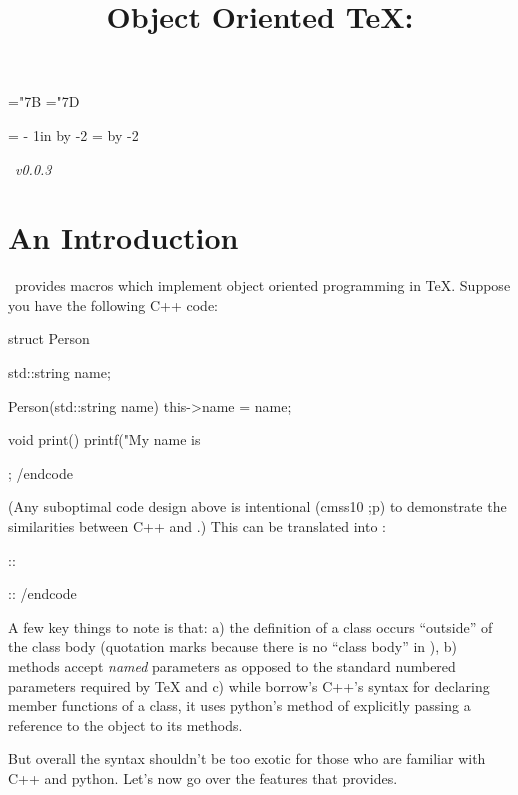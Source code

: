 \chardef\lbrace="7B
\chardef\rbrace="7D

\def\parameter#1{$\langle$#1$\rangle$}
\def\cparameter#1{$\{\langle$#1$\rangle\}$}
\def\bparameter#1{$[\langle$#1$\rangle]$}

\parindent=0pt
\parskip=3pt
\hoffset=\dimexpr 1.5cm - 1in \relax
\advance\hsize by -2\hoffset
\voffset=\hoffset
\advance\vsize by -2\voffset

\title{Object Oriented \TeX: \OoP\par}
\hfill \OoP\ {\it v0.0.3}\par

\section{An Introduction}

\OoP\ provides macros which implement object oriented programming in \TeX. Suppose you have the following C++ code:

\begincode
struct Person {
    std::string name;

    Person(std::string name) {
        this->name = name;
    }

    void print() {
        printf("My name is %
    }
};
/endcode

(Any suboptimal code design above is intentional ({\fontuse cmss10 ;p}) to demonstrate the similarities between C++ and \OoP.)
This can be translated into \OoP:

\begincode
\class\Person

\method\Person::

\method\Person::
/endcode

A few key things to note is that: a) the definition of a class occurs ``outside'' of the class body
(quotation marks because there is no ``class body'' in \OoP), b) methods accept {\it named} parameters
as opposed to the standard numbered parameters required by \TeX{} and c) while \OoP{} borrow's C++'s
syntax for declaring member functions of a class, it uses python's method of explicitly passing a
reference to the object to its methods.

But overall the syntax shouldn't be too exotic for those who are familiar with C++ and python.
Let's now go over the features that \OoP provides.

\section{\OoP}

